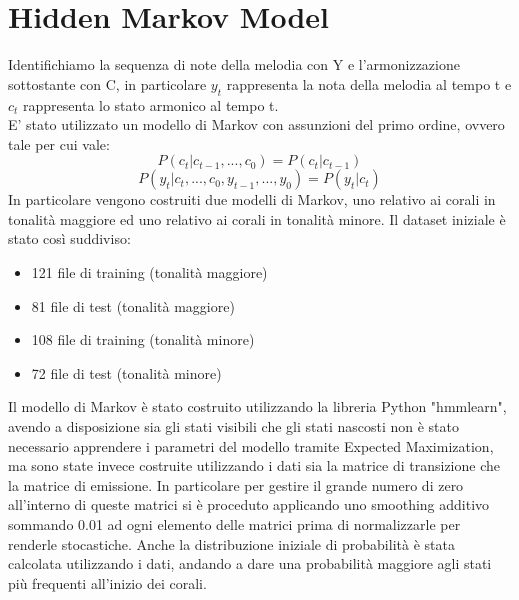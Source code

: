 \chapter{Hidden Markov Model}\label{ch:hmm-chords}
Identifichiamo la sequenza di note della melodia con Y e l'armonizzazione sottostante con C, in particolare $y_t$ rappresenta la nota della melodia al tempo t e $c_t$ rappresenta lo stato armonico al tempo t. \\
E' stato utilizzato un modello di Markov con assunzioni del primo ordine, ovvero tale per cui vale:
\begin{equation}
P(c_t|c_{t-1},...,c_0) = P(c_t|c_{t-1})
\end{equation}
\begin{equation}
P(y_t|c_t,...,c_0,y_{t-1},...,y_0) = P(y_t|c_t)
\end{equation}
In particolare vengono costruiti due modelli di Markov, uno relativo ai corali in tonalità maggiore ed uno relativo ai corali in tonalità minore.
Il dataset iniziale è stato così suddiviso:
\begin{itemize}
\item 121 file di training (tonalità maggiore)
\item 81 file di test (tonalità maggiore)
\item 108 file di training (tonalità minore)
\item 72 file di test (tonalità minore)
\end{itemize}
Il modello di Markov è stato costruito utilizzando la libreria Python "hmmlearn", avendo a disposizione sia gli stati visibili che gli stati nascosti non è stato necessario apprendere i parametri del modello tramite Expected Maximization, ma sono state invece costruite utilizzando i dati sia la matrice di transizione che la matrice di emissione.
In particolare per gestire il grande numero di zero all'interno di queste matrici si è proceduto applicando uno smoothing additivo sommando 0.01 ad ogni elemento delle matrici prima di normalizzarle per renderle stocastiche.
Anche la distribuzione iniziale di probabilità è stata calcolata utilizzando i dati, andando a dare una probabilità maggiore agli stati più frequenti all'inizio dei corali.
